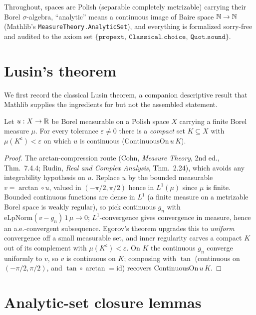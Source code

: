 Throughout, spaces are Polish (separable completely metrizable) carrying their Borel
\(\sigma\)-algebra, ``analytic'' means a continuous image of Baire space \(\mathbb{N}\to\mathbb{N}\) (Mathlib's
\texttt{MeasureTheory.AnalyticSet}), and everything is formalized sorry-free and audited to the
axiom set \(\{\texttt{propext},\ \texttt{Classical.choice},\ \texttt{Quot.sound}\}\).

\section{Lusin's theorem}

We first record the classical Lusin theorem, a companion descriptive result that Mathlib supplies
the ingredients for but not the assembled statement.

\begin{theorem}\label{thm:dst-lusin}
  \leanok
  Let \(u:X\to\mathbb{R}\) be Borel measurable on a Polish space \(X\) carrying a finite Borel measure
  \(\mu\). For every tolerance \(\varepsilon\neq 0\) there is a \emph{compact} set \(K\subseteq X\)
  with \(\mu(K^{\mathsf c})<\varepsilon\) on which \(u\) is continuous
  (\(\mathrm{ContinuousOn}\,u\,K\)).
\end{theorem}
\begin{proof}\leanok
  The arctan-compression route (Cohn, \emph{Measure Theory}, 2nd ed., Thm.~7.4.4; Rudin,
  \emph{Real and Complex Analysis}, Thm.~2.24), which avoids any integrability hypothesis on
  \(u\). Replace \(u\) by the bounded measurable \(v=\arctan\circ u\), valued in
  \((-\pi/2,\pi/2)\) hence in \(L^1(\mu)\) since \(\mu\) is finite. Bounded continuous functions
  are dense in \(L^1\) (a finite measure on a metrizable Borel space is weakly regular), so pick
  continuous \(g_n\) with \(\mathrm{eLpNorm}(v-g_n)\,1\,\mu\to 0\); \(L^1\)-convergence gives
  convergence in measure, hence an a.e.-convergent subsequence. Egorov's theorem upgrades this to
  \emph{uniform} convergence off a small measurable set, and inner regularity carves a compact
  \(K\) out of its complement with \(\mu(K^{\mathsf c})<\varepsilon\). On \(K\) the continuous
  \(g_n\) converge uniformly to \(v\), so \(v\) is continuous on \(K\); composing with \(\tan\)
  (continuous on \((-\pi/2,\pi/2)\), and \(\tan\circ\arctan=\mathrm{id}\)) recovers
  \(\mathrm{ContinuousOn}\,u\,K\).
\end{proof}

\section{Analytic-set closure lemmas}

